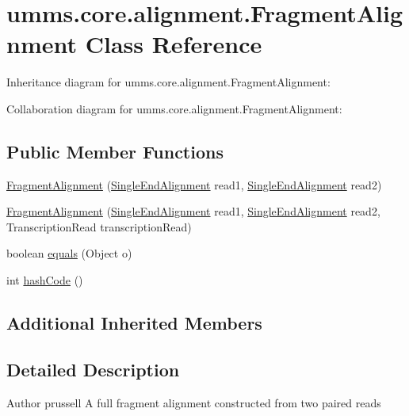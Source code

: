\hypertarget{classumms_1_1core_1_1alignment_1_1_fragment_alignment}{\section{umms.\+core.\+alignment.\+Fragment\+Alignment Class Reference}
\label{classumms_1_1core_1_1alignment_1_1_fragment_alignment}
}


Inheritance diagram for umms.\+core.\+alignment.\+Fragment\+Alignment\+:


Collaboration diagram for umms.\+core.\+alignment.\+Fragment\+Alignment\+:
\subsection*{Public Member Functions}
\begin{DoxyCompactItemize}
\item 
\hyperlink{classumms_1_1core_1_1alignment_1_1_fragment_alignment_acc72a2b50252c51b4d498204ee7efb2b}{Fragment\+Alignment} (\hyperlink{classumms_1_1core_1_1alignment_1_1_single_end_alignment}{Single\+End\+Alignment} read1, \hyperlink{classumms_1_1core_1_1alignment_1_1_single_end_alignment}{Single\+End\+Alignment} read2)
\item 
\hyperlink{classumms_1_1core_1_1alignment_1_1_fragment_alignment_a21910a9455f7de2888d3b3ee09f2676f}{Fragment\+Alignment} (\hyperlink{classumms_1_1core_1_1alignment_1_1_single_end_alignment}{Single\+End\+Alignment} read1, \hyperlink{classumms_1_1core_1_1alignment_1_1_single_end_alignment}{Single\+End\+Alignment} read2, Transcription\+Read transcription\+Read)
\item 
boolean \hyperlink{classumms_1_1core_1_1alignment_1_1_fragment_alignment_ab756a9084fafcf8a04cf91ae604daab4}{equals} (Object o)
\item 
int \hyperlink{classumms_1_1core_1_1alignment_1_1_fragment_alignment_a073d4dcb47e92fba08a8e4c719062359}{hash\+Code} ()
\end{DoxyCompactItemize}
\subsection*{Additional Inherited Members}


\subsection{Detailed Description}
\begin{DoxyAuthor}{Author}
prussell A full fragment alignment constructed from two paired reads 
\end{DoxyAuthor}


